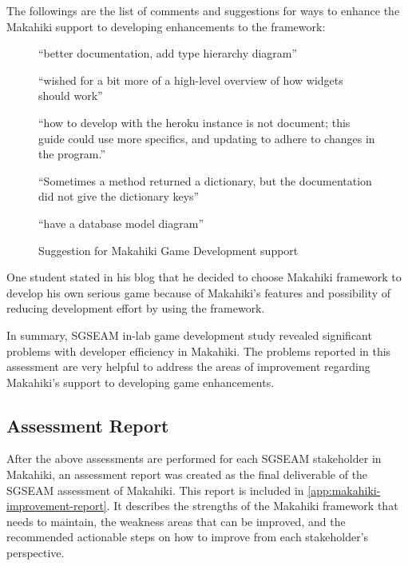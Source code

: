 The followings are the list of comments and suggestions for ways to enhance the Makahiki support to developing enhancements to the framework:

\begin{figure}[ht!]
\begin{mybox}
\begin{compactenum}
	\item ``better documentation, add type hierarchy diagram''
	\item ``wished for a bit more of a high-level overview of how widgets should work''
	\item ``how to develop with the heroku instance is not document; this guide could use more specifics, and updating to adhere to changes in the program.''
	\item ``Sometimes a method returned a dictionary, but the documentation did not give the dictionary keys''
	\item ``have a database model diagram''
\end{compactenum}
\end{mybox}
\caption{Suggestion for Makahiki Game Development support}
\label{fig:develop-suggestion}  
\end{figure}

One student stated in his blog that he decided to choose Makahiki
framework to develop his own serious game because of Makahiki's features and possibility
of reducing development effort by using the framework. 

In summary, SGSEAM in-lab game development study revealed significant problems with developer efficiency in Makahiki. The problems reported in this assessment are very helpful to address the areas of improvement regarding Makahiki's support to developing game enhancements.

\subsection{Assessment Report}

After the above assessments are performed for each SGSEAM stakeholder in Makahiki, an assessment report was created as the final deliverable of the SGSEAM assessment of Makahiki. This report is included in \autoref{app:makahiki-improvement-report}. It  describes the strengths of the Makahiki framework that needs to maintain, the weakness areas that can be improved, and the recommended actionable steps on how to improve from each stakeholder's perspective. 

